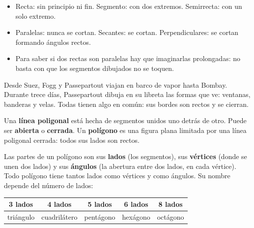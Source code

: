 \documentclass[11pt]{article}
\begin{document}
\begin{resumen}
\begin{itemize}
  \item Recta: sin principio ni fin. Segmento: con dos extremos. Semirrecta:
        con un solo extremo.
  \item Paralelas: nunca se cortan. Secantes: se cortan. Perpendiculares: se
        cortan formando ángulos rectos.
  \item Para saber si dos rectas son paralelas hay que imaginarlas
        prolongadas: no basta con que los segmentos dibujados no se toquen.
\end{itemize}
\end{resumen}

\label{tema:poligonos}

\begin{hilo}
Desde Suez, Fogg y Passepartout viajan en barco de vapor hasta Bombay.
Durante trece días, Passepartout dibuja en su libreta las formas que ve:
ventanas, banderas y velas. Todas tienen algo en común: sus bordes son
rectos y se cierran.
\end{hilo}

Una \textbf{línea poligonal} está hecha de segmentos unidos uno detrás de
otro. Puede ser \textbf{abierta} o \textbf{cerrada}. Un \textbf{polígono} es
una figura plana limitada por una línea poligonal cerrada: todos sus lados
son rectos.

\begin{center}
\end{center}

Las partes de un polígono son sus \textbf{lados} (los segmentos), sus
\textbf{vértices} (donde se unen dos lados) y sus \textbf{ángulos} (la
abertura entre dos lados, en cada vértice). Todo polígono tiene tantos lados
como vértices y como ángulos. Su nombre depende del número de lados:

\begin{center}
{\renewcommand{\arraystretch}{1.4}
\begin{tabular}{|c|c|c|c|c|}
  \hline
  3 lados & 4 lados & 5 lados & 6 lados & 8 lados\\\hline
  triángulo & cuadrilátero & pentágono & hexágono & octágono\\\hline
\end{tabular}}
\end{center}
\end{document}
